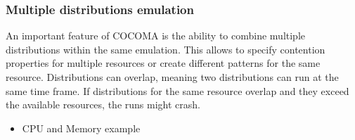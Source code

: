 \documentclass[letterpaper,10pt,english]{sphinxhowto}
\begin{document}
\subsubsection{Multiple distributions emulation}
\label{COCOMA/05_examples:multiple-distributions-emulation}
An important feature of COCOMA is the ability to combine multiple distributions within the same emulation. This allows to specify contention properties for multiple resources or create different patterns for the same resource. Distributions can overlap, meaning two distributions can run at the same time frame. If distributions for the same resource overlap and they exceed the available resources, the runs might crash.
\begin{itemize}
\item {} 
CPU and Memory example

\end{itemize}
\end{document}
